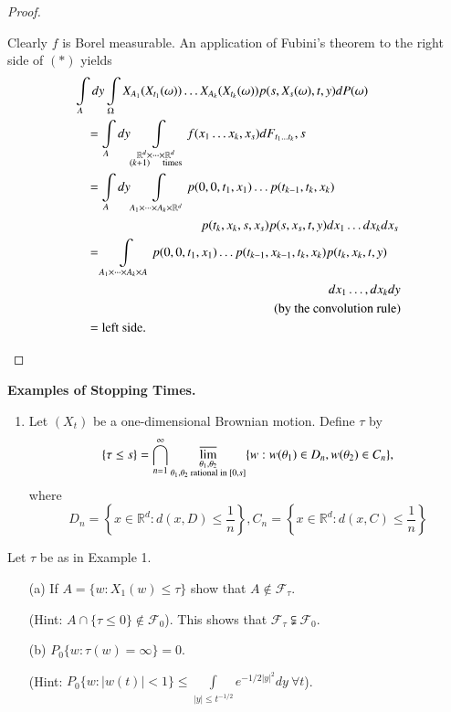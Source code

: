 \begin{proof}
\begin{enumerate}
Clearly $f$ is Borel measurable. An application of Fubini's theorem to
the right side of $(*)$ yields
\begin{align*}
&\int\limits_{A}dy\int\limits_{\Omega}X_{A_{1}}(X_{t_{1}}(\omega))\ldots
  X_{A_{k}}(X_{t_{k}}(\omega))p(s,X_{s}(\omega),t,y)dP(\omega)\\
&\q =
  \int\limits_{A}dy\int\limits_{\substack{\mathbb{R}^{d}\times\cdots\times
  \mathbb{R}^{d}\\ (k+1)\q\text{times}}}f(x_{1}\ldots
  x_{k},x_{s})dF_{t_{1}\ldots t_{k}},s\\
&\q =\int\limits_{A}dy\int\limits_{A_{1}\times\cdots\times A_{k}\times
    \mathbb{R}^{d}}p(0,0,t_{1},x_{1})\ldots p(t_{k-1},t_{k},x_{k})\\
&\hspace{3.5cm} p(t_{k},x_{k},s,x_{s})p(s,x_{s},t,y)dx_{1}\ldots
  dx_{k}dx_{s}\\
&\q =\int\limits_{A_{1}\times\cdots \times A_{k}\times
    A}p(0,0,t_{1},x_{1})\ldots
  p(t_{k-1},x_{k-1},t_{k},x_{k})p(t_{k},x_{k},t,y)\\
&\hspace{7cm} dx_{1}\ldots,dx_{k}dy\\
&\hspace{5.5cm} \text{(by the convolution rule)}\\
&\q = \text{left side}.
\end{align*}
\end{enumerate}
\end{proof}

\noindent
{\large\bf Examples of Stopping Times.}
\begin{enumerate}
\item Let $(X_{t})$ be a one-dimensional Brownian motion. Define
  $\tau$ by
$$
\{\tau\leq
s\}=\bigcap\limits^{\infty}_{n=1}{\displaystyle{\mathop{\varlimsup}_{\substack{\theta_{1},\theta_{2}\\ \theta_{1},\theta_{2}\text{~
  rational in~ } [0,s]}}}}\{w:w(\theta_{1})\in D_{n},w(\theta_{2})\in
C_{n}\}, 
$$\pageoriginale
where 
$$
D_{n}=\left\{x\in\mathbb{R}^{d}:d(x,D)\leq \frac{1}{n}\right\},
C_{n}=\left\{x\in \mathbb{R}^{d}:d(x,C)\leq \frac{1}{n}\right\}
$$
\end{enumerate}

\setcounter{exercise}{0}
\begin{exercise}\label{chap6-exer1}
Let $\tau$ be as in Example 1.
\begin{itemize}
\item[(a)] If $A=\{w:X_{1}(w)\leq \tau\}$ show that $A\notin
  \mathscr{F}_{\tau}$. 

(Hint: $A\cap \{\tau\leq 0\}\not\in \mathscr{F}_{0}$). This shows that
  $\mathscr{F}_{\tau}\subsetneqq \mathscr{F}_{0}$.

\item[(b)] $P_{0}\{w:\tau(w)=\infty\}=0$.

(Hint: $P_{0}\{w:|w(t)|<1\}\leq \int\limits_{|y|\leq
  t^{-1/2}}e^{-1/2|y|^{2}}dy\ \forall t$).
\end{itemize}
\end{exercise}

